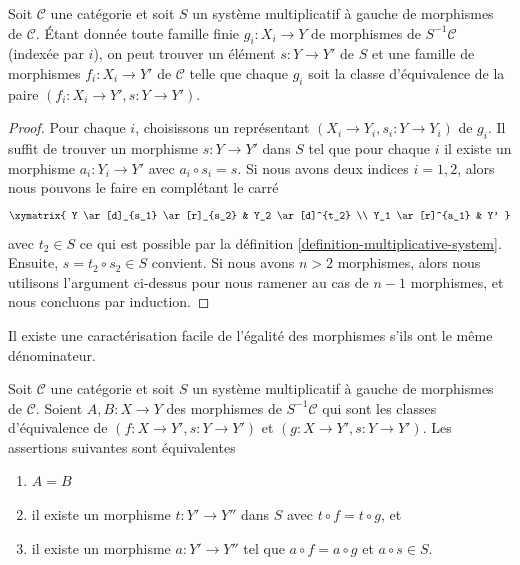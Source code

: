 \begin{lemma}
\label{lemma-morphisms-left-localization}
Soit $\mathcal{C}$ une catégorie et soit $S$ un système multiplicatif à gauche
de morphismes de $\mathcal{C}$. Étant donnée toute famille finie $g_i : X_i \to Y$ de morphismes de $S^{-1}\mathcal{C}$ (indexée par $i$), on peut trouver
un élément $s : Y \to Y'$ de $S$ et une famille de morphismes $f_i : X_i \to Y'$ de $\mathcal{C}$ telle que chaque $g_i$ soit la classe d'équivalence de la
paire $(f_i : X_i \to Y', s : Y \to Y')$.
\end{lemma}

\begin{proof}
Pour chaque $i$, choisissons un représentant $(X_i \to Y_i, s_i : Y \to Y_i)$
de $g_i$. Il suffit de trouver un morphisme $s : Y \to Y'$ dans
$S$ tel que pour chaque $i$ il existe un morphisme $a_i : Y_i \to Y'$ avec
$a_i \circ s_i = s$. Si nous avons deux indices $i = 1, 2$, alors nous pouvons
le faire en complétant le carré
$$
\xymatrix{
Y \ar[d]_{s_1} \ar[r]_{s_2} & Y_2 \ar[d]^{t_2} \\
Y_1 \ar[r]^{a_1} & Y'
}
$$
avec $t_2 \in S$ ce qui est possible par la définition
\ref{definition-multiplicative-system}. Ensuite, $s = t_2 \circ s_2 \in S$
convient. Si nous avons $n > 2$ morphismes, alors nous utilisons
l'argument ci-dessus pour nous ramener au cas de $n - 1$ morphismes, et nous concluons
par induction.
\end{proof}

\noindent
Il existe une caractérisation facile de l'égalité des morphismes s'ils ont le
même dénominateur.

\begin{lemma}
\label{lemma-equality-morphisms-left-localization}
Soit $\mathcal{C}$ une catégorie et soit $S$ un système multiplicatif à gauche
de morphismes de $\mathcal{C}$. Soient $A, B : X \to Y$ des morphismes de
$S^{-1}\mathcal{C}$ qui sont les classes d'équivalence de $(f : X \to Y', s : Y \to Y')$ et $(g : X \to Y', s : Y \to Y')$. Les assertions suivantes sont
équivalentes
\begin{enumerate}
\item $A = B$
\item il existe un morphisme $t : Y' \to Y''$ dans $S$ avec $t \circ f = t \circ g$, et
\item il existe un morphisme $a : Y' \to Y''$ tel que $a \circ f = a \circ g$
et $a \circ s \in S$.
\end{enumerate}
\end{lemma}

